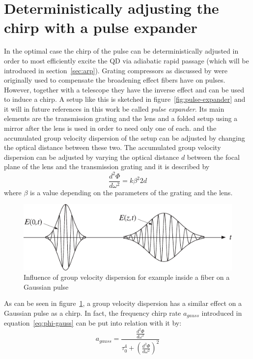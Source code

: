 \section{Deterministically adjusting the chirp with a pulse expander}
\label{sec:pulse-expander}
In the optimal case the chirp of the pulse can be deterministically adjusted in order to most efficiently excite the \ac{QD} via adiabatic rapid passage (which will be introduced in section~\ref{sec:arp}).
Grating compressors as discussed by \textcite{martinez_3000_1987} were originally used to compensate the broadening effect fibers have on pulses.
However, together with a telescope they have the inverse effect and can be used to induce a chirp.
A setup like this is sketched in figure~\ref{fig:pulse-expander} and it will in future references in this work be called \textit{pulse expander}.
Its main elements are the transmission grating and the lens and a folded setup using a mirror after the lens is used in order to need only one of each. and the accumulated group velocity dispersion of the setup can be adjusted by changing the optical distance between these two.
The accumulated group velocity dispersion can be adjusted by varying the optical distance $d$ between the focal plane of the lens and the transmission grating and it is described by
\begin{equation}
\frac{d^2 \Phi}{d \omega^2} = k \beta^2 2 d
\end{equation}
where $\beta$ is a value depending on the parameters of the grating and the lens.
\begin{figure}[H]
	\centering
	\includegraphics[width=0.7\linewidth]{figures/chirp/group-velocity-dispersion}
	\caption{Influence of group velocity dispersion for example inside a fiber on a Gaussian pulse~\cite{orfanidis_electromagnetic_2002}}
	\label{fig:group-velocity-dispersion}
\end{figure}

As can be seen in figure~\ref{fig:group-velocity-dispersion}, a group velocity dispersion has a similar effect on a Gaussian pulse as a chirp.
In fact, the frequency chirp rate $a_{gauss}$ introduced in equation~\eqref{eq:phi-gauss} can be put into relation with it by:~\cite{orfanidis_electromagnetic_2002}
\begin{equation}
a_{gauss} = \frac{\frac{d^2 \Phi}{d \omega^2}}{\tau_0^4 + \left(\frac{d^2 \Phi}{d \omega^2}\right)^2}
\end{equation}


